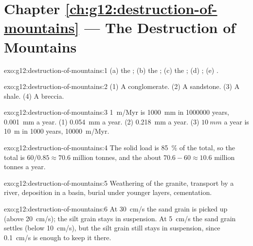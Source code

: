 \section*{Chapter \ref{ch:g12:destruction-of-mountains} --- The Destruction of Mountains}

\begin{solution}{exo:g12:destruction-of-mountains:1}
(a) the ; (b) the ; (c) the ;
(d) ; (e) .
\end{solution}

\begin{solution}{exo:g12:destruction-of-mountains:2}
(1) A conglomerate. (2) A sandstone. (3) A shale. (4) A breccia.
\end{solution}

\begin{solution}{exo:g12:destruction-of-mountains:3}
\qty{1}{m/Myr} is \qty{1000}{mm} in \num{1000000} years, \qty{0.001}{mm} a
year. (1) \qty{0.054}{mm} a year. (2) \qty{0.218}{mm} a year.
(3) $\qty{10}{mm}$ a year is \qty{10}{m} in 1000 years, \qty{10000}{m/Myr}.
\end{solution}

\begin{solution}{exo:g12:destruction-of-mountains:4}
The solid load is \qty{85}{\percent} of the total, so the total is $60/0.85
\approx 70.6$ million tonnes, and the  about $70.6 - 60 \approx
10.6$ million tonnes a year.
\end{solution}

\begin{solution}{exo:g12:destruction-of-mountains:5}
Weathering of the granite, transport by a river, deposition in a basin,
burial under younger layers, cementation.
\end{solution}

\begin{solution}{exo:g12:destruction-of-mountains:6}
At \qty{30}{cm/s} the sand grain is picked up (above \qty{20}{cm/s}); the
silt grain stays in suspension. At \qty{5}{cm/s} the sand grain settles
(below \qty{10}{cm/s}), but the silt grain still stays in suspension, since
\qty{0.1}{cm/s} is enough to keep it there.
\end{solution}

